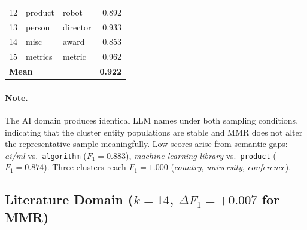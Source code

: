 \documentclass[11pt,a4paper]{article}
\begin{document}
\begin{table}[h]
\begin{tabular}{r l l r}
12 & product      & robot                                    & \cellcolor{red!15}0.892 \\
13 & person       & director                                 & \cellcolor{yellow!25}0.933 \\
14 & misc         & award                                    & \cellcolor{red!15}0.853 \\
15 & metrics      & metric                                   & \cellcolor{yellow!25}0.962 \\
\midrule
\multicolumn{3}{l}{\textbf{Mean}} & \textbf{0.922} \\
\bottomrule
\end{tabular}
\end{table}

\paragraph{Note.}
The AI domain produces identical LLM names under both sampling conditions, indicating that the cluster entity populations are stable and MMR does not alter the representative sample meaningfully.
Low scores arise from semantic gaps: \textit{ai/ml} vs.\ \texttt{algorithm} ($F_1 = 0.883$), \textit{machine learning library} vs.\ \texttt{product} ($F_1 = 0.874$).
Three clusters reach $F_1 = 1.000$ (\textit{country}, \textit{university}, \textit{conference}).

\FloatBarrier

\subsection{Literature Domain ($k = 14$, $\Delta F_1 = +0.007$ for MMR)}
\end{document}
